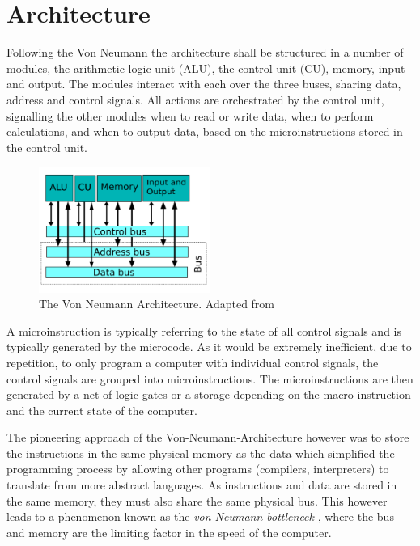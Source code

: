 \section{Architecture}

Following the Von Neumann the architecture shall be structured in a number of modules, the arithmetic logic unit (ALU), the control unit (CU), memory, input and output. The modules interact with each over the three buses, sharing data, address and control signals. All actions are orchestrated by the control unit, signalling the other modules when to read or write data, when to perform calculations, and when to output data, based on the microinstructions stored in the control unit.

\begin{figure}[H]
  \begin{center}
    \includegraphics[width=0.5\textwidth]{figures/VNA}
  \end{center}
  \caption{The Von Neumann Architecture. Adapted from \cite{fig-vna}}\label{fig:vna}
\end{figure}

A microinstruction is typically referring to the state of all control signals and is typically generated by the microcode. As it would be extremely inefficient, due to repetition, to only program a computer with individual control signals, the control signals are grouped into microinstructions. The microinstructions are then generated by a net of logic gates or a storage depending on the macro instruction and the current state of the computer.

The pioneering approach of the Von-Neumann-Architecture however was to store the instructions in the same physical memory as the data which simplified the programming process by allowing other programs (compilers, interpreters) to translate from more abstract languages. As instructions and data are stored in the same memory, they must also share the same physical bus. This however leads  to a phenomenon known as the \textit{von Neumann bottleneck} \cite{cit.needed}, where the bus and memory are the limiting factor in the speed of the computer. 

